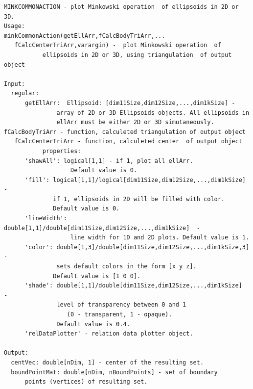 \documentclass[letterpaper,10pt,english]{sphinxmanual}
\begin{document}
\begin{Verbatim}[commandchars=\\\{\}]
MINKCOMMONACTION - plot Minkowski operation  of ellipsoids in 2D or 3D.
Usage:
minkCommonAction(getEllArr,fCalcBodyTriArr,...
   fCalcCenterTriArr,varargin) -  plot Minkowski operation  of
           ellipsoids in 2D or 3D, using triangulation  of output object

Input:
  regular:
      getEllArr:  Ellipsoid: [dim11Size,dim12Size,...,dim1kSize] -
               array of 2D or 3D Ellipsoids objects. All ellipsoids in
               ellArr must be either 2D or 3D simutaneously.
fCalcBodyTriArr - function, calculeted triangulation of output object
   fCalcCenterTriArr - function, calculeted center  of output object
           properties:
      'shawAll': logical[1,1] - if 1, plot all ellArr.
                   Default value is 0.
      'fill': logical[1,1]/logical[dim11Size,dim12Size,...,dim1kSize]  -
              if 1, ellipsoids in 2D will be filled with color.
              Default value is 0.
      'lineWidth': double[1,1]/double[dim11Size,dim12Size,...,dim1kSize]  -
                   line width for 1D and 2D plots. Default value is 1.
      'color': double[1,3]/double[dim11Size,dim12Size,...,dim1kSize,3] -
               sets default colors in the form [x y z].
              Default value is [1 0 0].
      'shade': double[1,1]/double[dim11Size,dim12Size,...,dim1kSize]  -
               level of transparency between 0 and 1
                  (0 - transparent, 1 - opaque).
               Default value is 0.4.
      'relDataPlotter' - relation data plotter object.

Output:
  centVec: double[nDim, 1] - center of the resulting set.
  boundPointMat: double[nDim, nBoundPoints] - set of boundary
      points (vertices) of resulting set.
\end{Verbatim}
\end{document}
